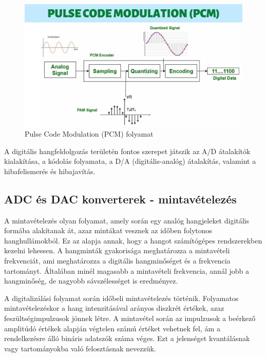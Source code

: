 \begin{figure}[H]
	\centering
	\includegraphics[width=\linewidth, keepaspectratio]{figures/pulse _code_modulation.jpg}
	\caption{Pulse Code Modulation (PCM) folyamat~\cite{PULSECODEMODULATION}}\label{fig:pcm}
\end{figure}
A digitális hangfeldolgozás területén fontos szerepet játszik az A/D átalakítók kialakítása, 
a kódolás folyamata, a D/A (digitális-analóg) átalakítás, valamint a hibafelismerés és hibajavítás.
\subsection{ADC és DAC konverterek - mintavételezés}
A mintavételezés olyan folyamat, amely során egy analóg hangjeleket digitális formába alakítanak át, azaz mintákat vesznek az időben folytonos hanghullámokból. 
Ez az alapja annak, hogy a hangot számítógépes rendszerekben kezelni lehessen. A hangminták gyakorisága meghatározza a mintavételi frekvenciát, 
ami meghatározza a digitális hangminőséget és a frekvencia tartományt. Általában minél magasabb a mintavételi frekvencia, annál jobb a hangminőség, 
de nagyobb sávszélességet is eredményez.

A digitalizálási folyamat során időbeli mintavételezés történik. 
Folyamatos mintavételezéskor a hang intenzitásával arányos diszkrét értékek, azaz feszültségimpulzusok jönnek létre. 
A mintavétel során az impulzusok a beérkező amplitúdó értékek alapján végtelen számú értéket vehetnek fel, 
ám a rendelkezésre álló bináris adatszók száma véges. Ezt a jelenséget kvantálásnak vagy tartományokba 
való felosztásnak nevezzük.

